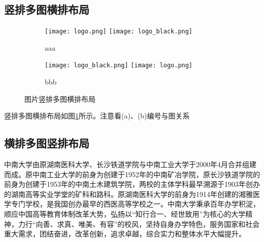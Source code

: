 \subsection{竖排多图横排布局}

\begin{figure}[!htb]
    \centering
    \begin{subfigure}[t]{0.13\linewidth}
        \captionsetup{justification=centering} 
        \begin{minipage}[b]{1\linewidth}
        \texttt{[image: logo.png]} 
        \vspace{-1ex} \vfill
        \texttt{[image: logo\_black.png]}
        \caption{aaa}
        \end{minipage}
    \end{subfigure}
    \begin{subfigure}[t]{0.13\linewidth}
        \captionsetup{justification=centering} 
        \begin{minipage}[b]{1\linewidth}
        \texttt{[image: logo\_black.png]} 
        \vspace{-1ex} \vfill
        \texttt{[image: logo.png]}
        \caption{bbb}
        \end{minipage}
    \end{subfigure}
    \caption{图片竖排多图横排布局}
    \label{f.csu_col_row}
\end{figure}

竖排多图横排布局如图\ref{f.csu_col_row}所示。注意看(a)、(b)编号与图关系


\subsection{横排多图竖排布局}

中南大学由原湖南医科大学、长沙铁道学院与中南工业大学于2000年4月合并组建而成。原中南工业大学的前身为创建于1952年的中南矿冶学院，原长沙铁道学院的前身为创建于1953年的中南土木建筑学院，两校的主体学科最早溯源于1903年创办的湖南高等实业学堂的矿科和路科。原湖南医科大学的前身为1914年创建的湘雅医学专门学校，是我国创办最早的西医高等学校之一。中南大学秉承百年办学积淀，顺应中国高等教育体制改革大势，弘扬以“知行合一、经世致用”为核心的大学精神，力行“向善、求真、唯美、有容”的校风，坚持自身办学特色，服务国家和社会重大需求，团结奋进，改革创新，追求卓越，综合实力和整体水平大幅提升。

